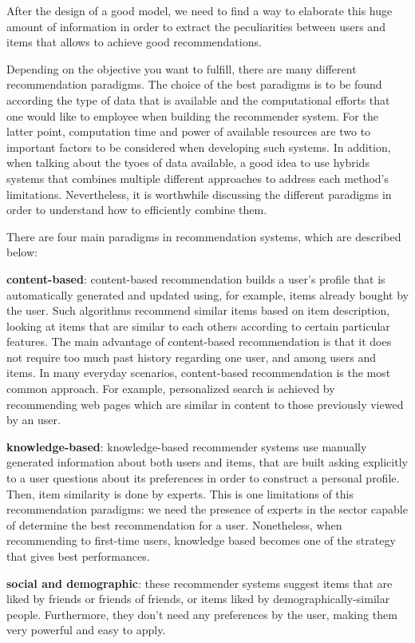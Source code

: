 After the design of a good model, we need to find a way to elaborate this huge amount of information in order to extract the peculiarities between users and items that allows to achieve good recommendations. 

Depending on the objective you want to fulfill, there are many different recommendation paradigms. The choice of the best paradigms is to be found according the type of data that is available and the computational efforts that one would like to employee when building the recommender system. For the latter point, computation time and power of available resources are two to important factors to be considered when developing such systems. In addition, when talking about the tyoes of data available, a good idea to use hybrids systems that combines multiple different approaches to address each method’s limitations. Nevertheless, it is worthwhile discussing the different paradigms in order to understand how to efficiently combine them. 

There are four main paradigms in recommendation systems, which are described below:

\textbf{content-based}: content-based recommendation builds a user's profile that is automatically generated and updated using, for example, items already bought by the user. Such algorithms recommend similar items based on item description, looking at items that are similar to each others according to certain particular features. The main advantage of content-based recommendation is that it does not require too much past history regarding one user, and among users and items. In many everyday scenarios, content-based recommendation is the most common approach. For example, personalized search is achieved by recommending web pages which are similar in content to those previously viewed by an user.

\textbf{knowledge-based}: knowledge-based recommender systems use manually generated information about both users and items, that are built asking explicitly to a user questions about its preferences in order to construct a personal profile. Then, item similarity is done by experts. This is one limitations of this recommendation paradigms: we need the presence of experts in the sector capable of determine the best recommendation for a user.
Nonetheless, when recommending to first-time users, knowledge based becomes one of the strategy that gives best performances.

\textbf{social and demographic}: these recommender systems suggest items that are liked by friends or friends of friends, or items liked by demographically-similar people. Furthermore, they don’t need any preferences by the user, making them very powerful and easy to apply.

